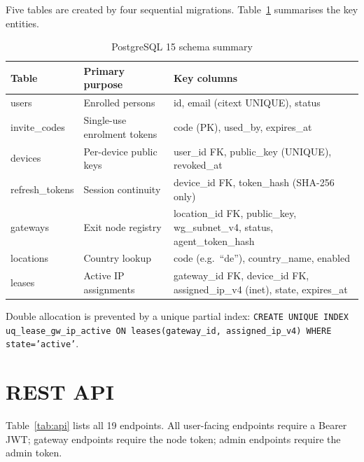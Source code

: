 \documentclass[12pt,a4paper]{report}
\begin{document}
Five tables are created by four sequential migrations. Table~\ref{tab:schema} summarises the key entities.

\begin{table}[H]
\centering\small
\caption{PostgreSQL 15 schema summary}
\label{tab:schema}
\begin{tabular}{lll}
\toprule
\textbf{Table} & \textbf{Primary purpose} & \textbf{Key columns}\\
\midrule
users & Enrolled persons & id, email (citext UNIQUE), status\\
invite\_codes & Single-use enrolment tokens & code (PK), used\_by, expires\_at\\
devices & Per-device public keys & user\_id FK, public\_key (UNIQUE), revoked\_at\\
refresh\_tokens & Session continuity & device\_id FK, token\_hash (SHA-256 only)\\
gateways & Exit node registry & location\_id FK, public\_key, wg\_subnet\_v4, status, agent\_token\_hash\\
locations & Country lookup & code (e.g.\ ``de''), country\_name, enabled\\
leases & Active IP assignments & gateway\_id FK, device\_id FK, assigned\_ip\_v4 (inet), state, expires\_at\\
\bottomrule
\end{tabular}
\end{table}

Double allocation is prevented by a unique partial index: \texttt{CREATE UNIQUE INDEX uq\_lease\_gw\_ip\_active ON leases(gateway\_id, assigned\_ip\_v4) WHERE state='active'}.

\section{REST API}

Table~\ref{tab:api} lists all 19 endpoints. All user-facing endpoints require a Bearer JWT; gateway endpoints require the node token; admin endpoints require the admin token.
\end{document}
